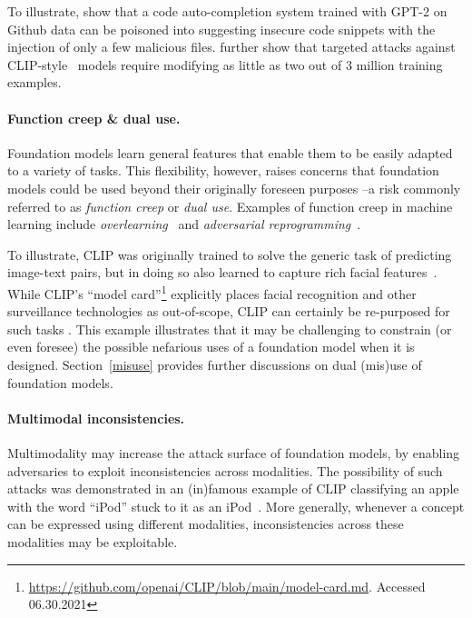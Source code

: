 To illustrate, \citet{schuster2021you} show that a code auto-completion system trained with GPT-2 on Github data can be poisoned into suggesting insecure code snippets with the injection of only a few malicious files.
\citet{carlini2021poisoning} further show that targeted attacks against CLIP-style~\citep{radford2021learning} models require modifying as little as two out of 3 million training examples.

\paragraph{Function creep \& dual use.} Foundation models learn general features that enable them to be easily adapted to a variety of tasks. This flexibility, however, raises  concerns that foundation models could be used beyond their originally foreseen purposes --a risk commonly referred to as \emph{function creep} or \emph{dual use}. Examples of function creep in machine learning include \emph{overlearning}~\citep{song2019overlearning} and \emph{adversarial reprogramming}~\citep{elsayed2018adversarial}.

To illustrate, CLIP was originally trained to solve the generic task of predicting image-text pairs, but in doing so also learned to capture rich facial features~\citep{goh2021multimodal}. While CLIP's ``model card''\footnote{\url{https://github.com/openai/CLIP/blob/main/model-card.md}. Accessed 06.30.2021} explicitly places facial recognition and other surveillance technologies as out-of-scope, CLIP can certainly be re-purposed for such tasks \citep{radiya2021data}. This example illustrates that it may be challenging to constrain (or even foresee) the possible nefarious uses of a foundation model when it is designed. Section~\ref{misuse} provides further discussions on dual (mis)use of foundation models.

\paragraph{Multimodal inconsistencies.} Multimodality may increase the attack surface of foundation models, by enabling adversaries to exploit inconsistencies across modalities. The possibility of such attacks was demonstrated in an (in)famous example of CLIP classifying an apple with the word ``iPod'' stuck to it as an iPod~\citep{goh2021multimodal}. More generally, whenever a concept can be expressed using different modalities, inconsistencies across these modalities may be exploitable.

